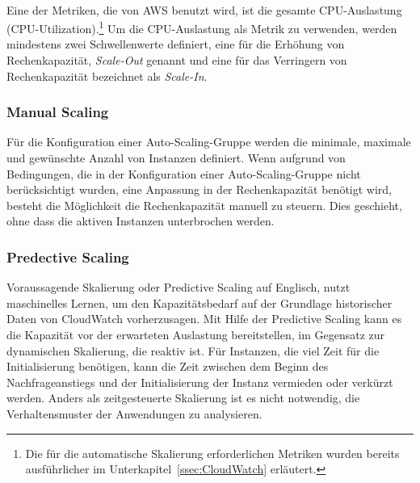 \\
Eine der Metriken, die von AWS %
benutzt wird, ist die gesamte CPU-Auslastung (CPU-Utilization).\footnote{Die für die automatische Skalierung erforderlichen Metriken wurden bereits ausführlicher im Unterkapitel~\ref{ssec:CloudWatch} erläutert.}
Um die CPU-Auslastung als Metrik zu verwenden, werden mindestens zwei Schwellenwerte definiert, eine für die Erhöhung von Rechenkapazität, \textit{Scale-Out} genannt und eine für das Verringern von Rechenkapazität bezeichnet als \textit{Scale-In}.

\subsubsection{Manual Scaling}
Für die Konfiguration einer Auto-Scaling-Gruppe werden die minimale, maximale und gewünschte Anzahl von Instanzen definiert. Wenn aufgrund von Bedingungen, die in der Konfiguration einer Auto-Scaling-Gruppe nicht berücksichtigt wurden, eine Anpassung in der Rechenkapazität benötigt wird, besteht die Möglichkeit die Rechenkapazität manuell zu steuern. Dies geschieht, ohne dass die aktiven Instanzen unterbrochen werden.

\subsubsection{Predective Scaling}%
Voraussagende Skalierung oder Predictive Scaling auf Englisch, nutzt maschinelles Lernen, um den Kapazitätsbedarf auf der Grundlage historischer Daten von CloudWatch vorherzusagen. Mit Hilfe der Predictive Scaling kann es die Kapazität vor der erwarteten Auslastung bereitstellen, im Gegensatz zur dynamischen Skalierung, die reaktiv ist. 
Für Instanzen, die viel Zeit für die Initialisierung benötigen, kann die Zeit zwischen dem Beginn des Nachfrageanstiegs und der Initialisierung der Instanz vermieden oder verkürzt werden.
Anders als zeitgesteuerte Skalierung ist es nicht notwendig, die Verhaltensmuster der Anwendungen zu analysieren.

